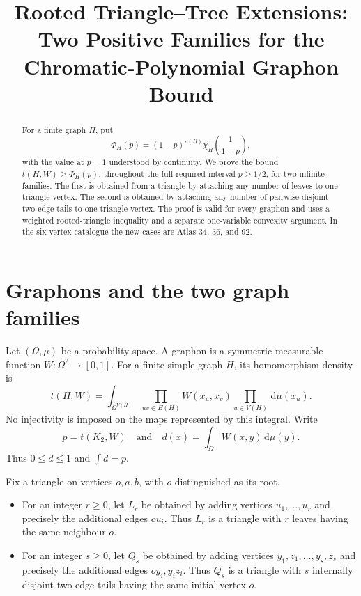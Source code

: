\documentclass[11pt]{article}
\title{Rooted Triangle--Tree Extensions:\\
Two Positive Families for the Chromatic-Polynomial Graphon Bound}
\author{}
\date{}
\newcommand{\dd}{\,\mathrm{d}}
\begin{document}
\maketitle

\begin{abstract}
For a finite graph $H$, put
\[
\Phi_H(p)=(1-p)^{v(H)}
\chi_H\!\left(\frac{1}{1-p}\right),
\]
with the value at $p=1$ understood by continuity.  We prove the bound
$t(H,W)\geq\Phi_H(p)$, throughout the full required interval
$p\geq 1/2$, for two infinite families.  The first is obtained from a
triangle by attaching any number of leaves to one triangle vertex.  The
second is obtained by attaching any number of pairwise disjoint two-edge
tails to one triangle vertex.  The proof is valid for every graphon and
uses a weighted rooted-triangle inequality and a separate one-variable
convexity argument.  In the six-vertex catalogue the new cases are Atlas
34, 36, and 92.
\end{abstract}


\section{Graphons and the two graph families}

Let $(\Omega,\mu)$ be a probability space.  A graphon is a symmetric
measurable function $W\colon\Omega^2\to[0,1]$.  For a finite simple graph
$H$, its homomorphism density is
\[
t(H,W)
=
\int_{\Omega^{V(H)}}
\prod_{uv\in E(H)}W(x_u,x_v)
\prod_{u\in V(H)}\dd\mu(x_u).
\]
No injectivity is imposed on the maps represented by this integral.  Write
\[
p=t(K_2,W)
\quad\text{and}\quad
d(x)=\int_\Omega W(x,y)\dd\mu(y).
\]
Thus $0\leq d\leq1$ and $\int d=p$.

Fix a triangle on vertices $o,a,b$, with $o$ distinguished as its root.

\begin{itemize}
\item For an integer $r\geq0$, let $L_r$ be obtained by adding vertices
$u_1,\ldots,u_r$ and precisely the additional edges $ou_i$.  Thus $L_r$
is a triangle with $r$ leaves having the same neighbour $o$.

\item For an integer $s\geq0$, let $Q_s$ be obtained by adding vertices
$y_1,z_1,\ldots,y_s,z_s$ and precisely the additional edges
$oy_i,y_iz_i$.  Thus $Q_s$ is a triangle with $s$ internally disjoint
two-edge tails having the same initial vertex $o$.
\end{itemize}
\end{document}

